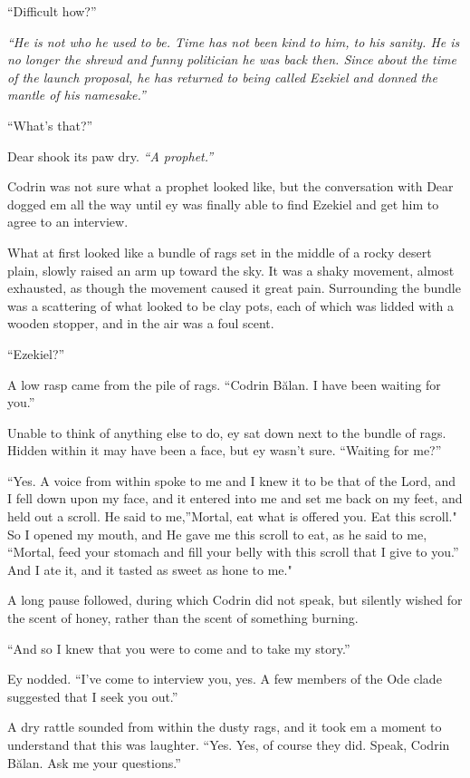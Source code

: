 ``Difficult how?''

\emph{``He is not who he used to be. Time has not been kind to him, to his sanity. He is no longer the shrewd and funny politician he was back then. Since about the time of the launch proposal, he has returned to being called Ezekiel and donned the mantle of his namesake.''}

``What's that?''

Dear shook its paw dry. \emph{``A prophet.''}

Codrin was not sure what a prophet looked like, but the conversation with Dear dogged em all the way until ey was finally able to find Ezekiel and get him to agree to an interview.

What at first looked like a bundle of rags set in the middle of a rocky desert plain, slowly raised an arm up toward the sky. It was a shaky movement, almost exhausted, as though the movement caused it great pain. Surrounding the bundle was a scattering of what looked to be clay pots, each of which was lidded with a wooden stopper, and in the air was a foul scent.

``Ezekiel?''

A low rasp came from the pile of rags. ``Codrin Bălan. I have been waiting for you.''

Unable to think of anything else to do, ey sat down next to the bundle of rags. Hidden within it may have been a face, but ey wasn't sure. ``Waiting for me?''

``Yes. A voice from within spoke to me and I knew it to be that of the Lord, and I fell down upon my face, and it entered into me and set me back on my feet, and held out a scroll. He said to me,''Mortal, eat what is offered you. Eat this scroll." So I opened my mouth, and He gave me this scroll to eat, as he said to me, ``Mortal, feed your stomach and fill your belly with this scroll that I give to you.'' And I ate it, and it tasted as sweet as hone to me."

A long pause followed, during which Codrin did not speak, but silently wished for the scent of honey, rather than the scent of something burning.

``And so I knew that you were to come and to take my story.''

Ey nodded. ``I've come to interview you, yes. A few members of the Ode clade suggested that I seek you out.''

A dry rattle sounded from within the dusty rags, and it took em a moment to understand that this was laughter. ``Yes. Yes, of course they did. Speak, Codrin Bălan. Ask me your questions.''

